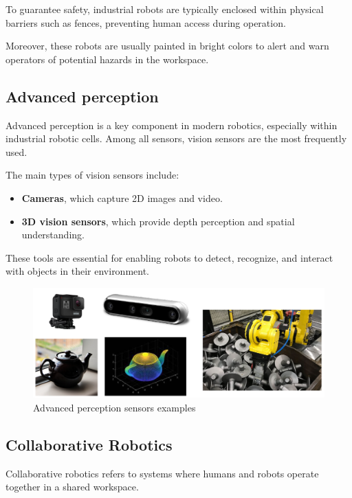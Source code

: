 To guarantee safety, industrial robots are typically enclosed within physical barriers such as fences, preventing human access during operation.

Moreover, these robots are usually painted in bright colors to alert and warn operators of potential hazards in the workspace.

\hfill

\subsection{Advanced perception}

Advanced perception is a key component in modern robotics, especially within industrial robotic cells. Among all sensors, vision sensors are the most frequently used.

The main types of vision sensors include:
\begin{itemize}
  \item \textbf{Cameras}, which capture 2D images and video.
  \item \textbf{3D vision sensors}, which provide depth perception and spatial understanding.
\end{itemize}

These tools are essential for enabling robots to detect, recognize, and interact with objects in their environment.

\begin{figure}[H]
    \centering
    \includegraphics[width=\linewidth]{imgs/advanced_perception_sensors.png}
    \caption{Advanced perception sensors examples}
\end{figure}

\hfill

\subsection{Collaborative Robotics}

Collaborative robotics refers to systems where humans and robots operate together in a shared workspace.

